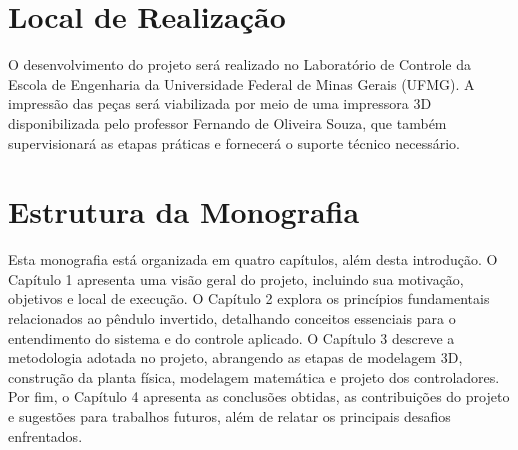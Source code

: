 

\section{Local de Realização}
\label{sec:empresa}

O desenvolvimento do projeto será realizado no Laboratório de Controle da Escola de Engenharia da Universidade Federal de Minas Gerais (UFMG). A impressão das peças será viabilizada por meio de uma impressora 3D disponibilizada pelo professor Fernando de Oliveira Souza, que também supervisionará as etapas práticas e fornecerá o suporte técnico necessário.


\section{Estrutura da Monografia}
\label{sec:organizacao}

Esta monografia está organizada em quatro capítulos, além desta introdução. O Capítulo 1 apresenta uma visão geral do projeto, incluindo sua motivação, objetivos e local de execução. O Capítulo 2 explora os princípios fundamentais relacionados ao pêndulo invertido, detalhando conceitos essenciais para o entendimento do sistema e do controle aplicado. O Capítulo 3 descreve a metodologia adotada no projeto, abrangendo as etapas de modelagem 3D, construção da planta física, modelagem matemática e projeto dos controladores. Por fim, o Capítulo 4 apresenta as conclusões obtidas, as contribuições do projeto e sugestões para trabalhos futuros, além de relatar os principais desafios enfrentados.


\clearpage